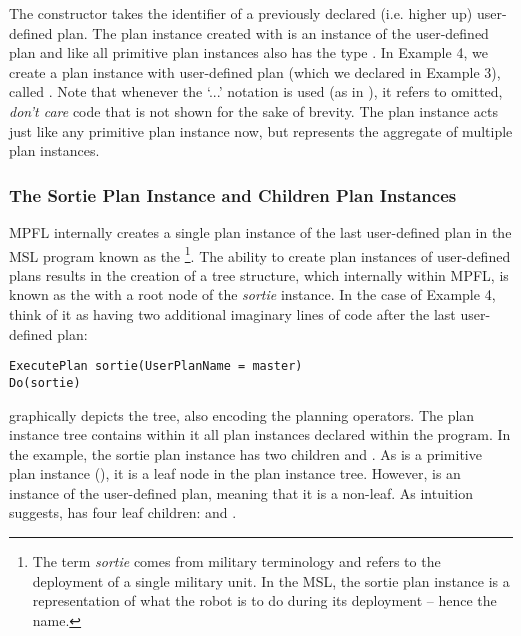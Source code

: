The  constructor takes the identifier of a previously declared (i.e. higher up) user-defined plan. The plan instance created with  is an instance of the user-defined plan and like all primitive plan instances also has the type . In Example 4, we create a plan instance with user-defined plan  (which we declared in Example 3), called . Note that whenever the `...' notation is used (as in ), it refers to omitted, \textit{don't care} code that is not shown for the sake of brevity. The plan instance  acts just like any primitive plan instance now, but represents the aggregate of multiple plan instances. 

\subsubsection{The Sortie Plan Instance and Children Plan Instances}
MPFL internally creates a single plan instance of the last user-defined plan in the MSL program known as the \footnote{The term \textit{sortie} comes from military terminology and refers to the deployment of a single military unit. In the MSL, the sortie plan instance is a representation of what the robot is to do during its deployment -- hence the name.}. The ability to create plan instances of user-defined plans results in the creation of a tree structure, which internally within MPFL, is known as the  with a root node of the \emph{sortie} instance. In the case of Example 4, think of it as having two additional imaginary lines of code after the last user-defined plan:
\begin{verbatim}
ExecutePlan sortie(UserPlanName = master)
Do(sortie)
\end{verbatim}


 graphically depicts the tree, also encoding the planning operators. The plan instance tree contains within it all plan instances declared within the program. In the example, the sortie plan instance has two children  and . As  is a primitive plan instance (), it is a leaf node in the plan instance tree. However,  is an instance of the  user-defined plan, meaning that it is a non-leaf. As intuition suggests,  has four leaf children:  and . 

